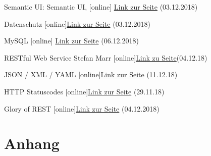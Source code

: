 \documentclass[11pt,
paper=a4,
bibtotocnumbered,	  %
liststotocnumbered,  %
DIV=calc,		  %
tablecaptionabove,	  %
headinclude,
]{article}
\begin{document}
\begin{description}
\item
Semantic UI: Semantic UI, [online] \href{https://semantic-ui.com} {Link zur Seite} (03.12.2018)
\item
Datenschutz [online]\href{https://www.datenschutz.org/unternehmen/}{Link zur Seite} (03.12.2018)
\item
MySQL [online] \href{https://www.mysql.com/de/why-mysql/}{Link zur Seite} (06.12.2018)
\item
 RESTful Web Service Stefan Marr [online]\href{http://stefan-marr.de/pages/restful-web-services/}{Link zu Seite}(04.12.18)
\item JSON / XML / YAML [online]\href{ https://www.predic8.de/xml-json-yaml.htm}{Link zur Seite} (11.12.18)
\item HTTP Statuscodes [online]\href{https://developer.mozilla.org/de/docs/Web/HTTP/Status} {Link zur Seite} (29.11.18)
\item Glory of REST [online]\href{https://martinfowler.com/articles/richardsonMaturityModel.html} {Link zur Seite} (04.12.2018)
\end{description}
\section{Anhang}
\end{document}
